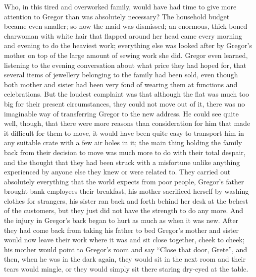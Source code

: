 Who, in this tired and overworked family, would have had time to give
more attention to Gregor than was absolutely necessary? The household
budget became even smaller; so now the maid was dismissed; an enormous,
thick-boned charwoman with white hair that flapped around her head came
every morning and evening to do the heaviest work; everything else was
looked after by Gregor’s mother on top of the large amount of sewing
work she did. Gregor even learned, listening to the evening
conversation about what price they had hoped for, that several items of
jewellery belonging to the family had been sold, even though both
mother and sister had been very fond of wearing them at functions and
celebrations. But the loudest complaint was that although the flat was
much too big for their present circumstances, they could not move out
of it, there was no imaginable way of transferring Gregor to the new
address. He could see quite well, though, that there were more reasons
than consideration for him that made it difficult for them to move, it
would have been quite easy to transport him in any suitable crate with
a few air holes in it; the main thing holding the family back from
their decision to move was much more to do with their total despair,
and the thought that they had been struck with a misfortune unlike
anything experienced by anyone else they knew or were related to. They
carried out absolutely everything that the world expects from poor
people, Gregor’s father brought bank employees their breakfast, his
mother sacrificed herself by washing clothes for strangers, his sister
ran back and forth behind her desk at the behest of the customers, but
they just did not have the strength to do any more. And the injury in
Gregor’s back began to hurt as much as when it was new. After they had
come back from taking his father to bed Gregor’s mother and sister
would now leave their work where it was and sit close together, cheek
to cheek; his mother would point to Gregor’s room and say “Close that
door, Grete”, and then, when he was in the dark again, they would sit
in the next room and their tears would mingle, or they would simply sit
there staring dry-eyed at the table.

